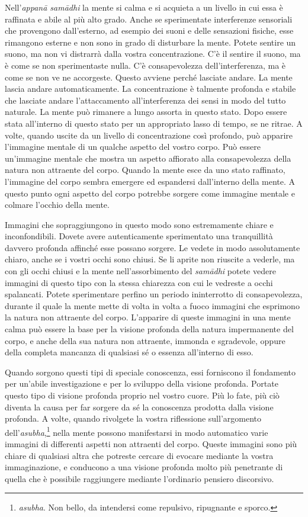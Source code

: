 Nell'\emph{appanā samādhi} la mente si calma e si acquieta a un livello
in cui essa è raffinata e abile al più alto grado. Anche se sperimentate
interferenze sensoriali che provengono dall'esterno, ad esempio dei
suoni e delle sensazioni fisiche, esse rimangono esterne e non sono in
grado di disturbare la mente. Potete sentire un suono, ma non vi
distrarrà dalla vostra concentrazione. C'è il sentire il suono, ma è
come se non sperimentaste nulla. C'è consapevolezza dell'interferenza,
ma è come se non ve ne accorgeste. Questo avviene perché lasciate
andare. La mente lascia andare automaticamente. La concentrazione è
talmente profonda e stabile che lasciate andare l'attaccamento
all'interferenza dei sensi in modo del tutto naturale. La mente può
rimanere a lungo assorta in questo stato. Dopo essere stata all'interno
di questo stato per un appropriato lasso di tempo, se ne ritrae. A
volte, quando uscite da un livello di concentrazione così profondo, può
apparire l'immagine mentale di un qualche aspetto del vostro corpo. Può
essere un'immagine mentale che mostra un aspetto affiorato alla
consapevolezza della natura non attraente del corpo. Quando la mente
esce da uno stato raffinato, l'immagine del corpo sembra emergere ed
espandersi dall'interno della mente. A questo punto ogni aspetto del
corpo potrebbe sorgere come immagine mentale e colmare l'occhio della
mente.

Immagini che sopraggiungono in questo modo sono estremamente chiare e
inconfondibili. Dovete avere autenticamente sperimentato una
tranquillità davvero profonda affinché esse possano sorgere. Le vedete
in modo assolutamente chiaro, anche se i vostri occhi sono chiusi. Se li
aprite non riuscite a vederle, ma con gli occhi chiusi e la mente
nell'assorbimento del \emph{samādhi} potete vedere immagini di questo
tipo con la stessa chiarezza con cui le vedreste a occhi spalancati.
Potete sperimentare perfino un periodo ininterrotto di consapevolezza,
durante il quale la mente mette di volta in volta a fuoco immagini che
esprimono la natura non attraente del corpo. L'apparire di queste
immagini in una mente calma può essere la base per la visione profonda
della natura impermanente del corpo, e anche della sua natura non
attraente, immonda e sgradevole, oppure della completa mancanza di
qualsiasi sé o essenza all'interno di esso.

Quando sorgono questi tipi di speciale conoscenza, essi forniscono il
fondamento per un'abile investigazione e per lo sviluppo della visione
profonda. Portate questo tipo di visione profonda proprio nel vostro
cuore. Più lo fate, più ciò diventa la causa per far sorgere da sé la
conoscenza prodotta dalla visione profonda. A volte, quando rivolgete la
vostra riflessione sull'argomento dell'\emph{asubha},\footnote{\emph{asubha}.
  Non bello, da intendersi come repulsivo, ripugnante e sporco.} nella
mente possono manifestarsi in modo automatico varie immagini di
differenti aspetti non attraenti del corpo. Queste immagini sono più
chiare di qualsiasi altra che potreste cercare di evocare mediante la
vostra immaginazione, e conducono a una visione profonda molto più
penetrante di quella che è possibile raggiungere mediante l'ordinario
pensiero discorsivo.

